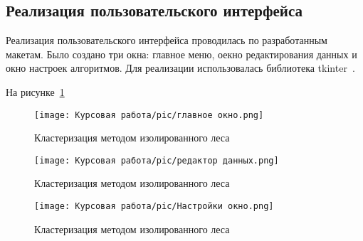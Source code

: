 \vspace{1.5em}
\subsection{Реализация пользовательского интерфейса}
\label{subsec:UserInt}
Реализация пользовательского интерфейса проводилась по разработанным макетам. Было создано три окна: главное меню, оекно редактирования данных и окно настроек алгоритмов. Для реализации использовалась библиотека tkinter~\cite{tkinter}.

На рисунке~\ref{ris:main_window}

\begin{figure}[!ht]
    \texttt{[image: Курсовая работа/pic/главное окно.png]}
    \caption{Кластеризация методом изолированного леса}
    \label{ris:main_window}
\end{figure}

\begin{figure}[!ht]
    \texttt{[image: Курсовая работа/pic/редактор данных.png]}
    \caption{Кластеризация методом изолированного леса}
    \label{ris:edit_window}
\end{figure}

\begin{figure}[!ht]
    \texttt{[image: Курсовая работа/pic/Настройки окно.png]}
    \caption{Кластеризация методом изолированного леса}
    \label{ris:settings_window}
\end{figure}